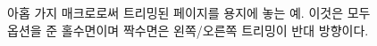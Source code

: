 \begin{figure}[htbp]
  \hfill

\caption{아홉 가지  매크로로써 트리밍된 페이지를 용지에 놓는 예. 이것은 모두  옵션을 준 홀수면이며 짝수면은 왼쪽/오른쪽 트리밍이 반대 방향이다.}
  \label{fig:setpage}
\end{figure}





